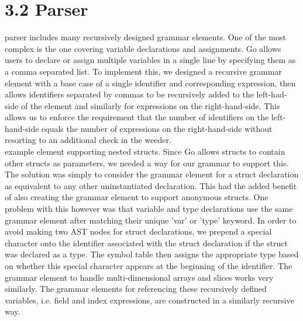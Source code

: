\documentclass{article}
\begin{document}
\section*{3.2 Parser}\mbox{}
 parser includes many recursively designed grammar elements.
One of the most complex is the one covering variable declarations and assignments.
Go allows users to declare or assign multiple variables in a single line by specifying them as a comma separated list.
To implement this, we designed a recursive grammar element with a base case of a single identifier and corresponding expression, then allows identifiers separated by commas to be recursively added to the left-had-side of the element and similarly for expressions on the right-hand-side.
This allows us to enforce the requirement that the number of identifiers on the left-hand-side equals the number of expressions on the right-hand-side without resorting to an additional check in the weeder.\\
 example element supporting nested structs.
Since Go allows structs to contain other structs as parameters, we needed a way for our grammar to support this.
The solution was simply to consider the grammar element for a struct declaration as equivalent to any other uninstantiated declaration.
This had the added benefit of also creating the grammar element to support anonymous structs.
One problem with this however was that variable and type declarations use the same grammar element after matching their unique 'var' or 'type' keyword.
In order to avoid making two AST nodes for struct declarations, we prepend a special character onto the identifier associated with the struct declaration if the struct was declared as a type.
The symbol table then assigns the appropriate type based on whether this special character appears at the beginning of the identifier.
The grammar element to handle multi-dimensional arrays and slices works very similarly.
The grammar elements for referencing these recursively defined variables, i.e. field and index expressions, are constructed in a similarly recursive way.
\end{document}
